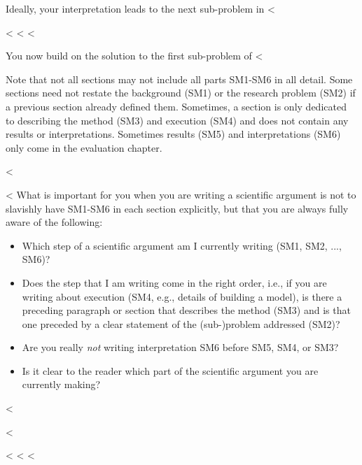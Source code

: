 {{{Ideally, your interpretation leads to the next sub-problem in <%

<%
<%
<%

You now build on the solution to the first sub-problem of <%

Note that not all sections may not include all parts SM1-SM6 in all detail.
Some sections need not restate the background (SM1) or the research problem (SM2) if a previous section already defined them.
Sometimes, a section is only dedicated to describing the method (SM3) and execution (SM4) and does not contain any results or interpretations.
Sometimes results (SM5) and interpretations (SM6) only come in the evaluation chapter.

<%
\begin{mindflow}
<%
  What is important for you when you are writing a scientific argument is not to slavishly have SM1-SM6 in each section explicitly, but that you are always fully aware of the following:
  \begin{itemize}
    \item Which step of a scientific argument am I currently writing (SM1, SM2, ..., SM6)?
    \item Does the step that I am writing come in the right order, i.e., if you are writing about execution (SM4, e.g., details of building a model), is there a preceding paragraph or section that describes the method (SM3) and is that one preceded by a clear statement of the (sub-)problem addressed (SM2)?
    \item Are you really \emph{not} writing interpretation SM6 before SM5, SM4, or SM3?
    \item Is it clear to the reader which part of the scientific argument you are currently making?
  \end{itemize}
<%
\end{mindflow}
<%

<%
<%
<%

}}}
